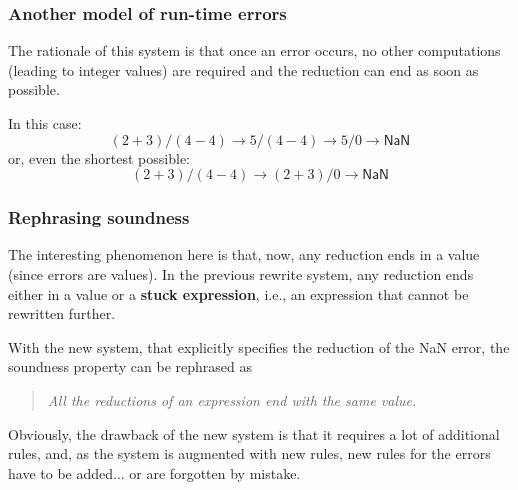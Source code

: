 \documentclass[compress,dvipdfmx]{beamer}
\newcommand{\NaN}{\textsf{NaN}\xspace}
\begin{document}
%
\begin{frame}
  \frametitle{Another model of run-time errors}

  The rationale of this system is that once an error occurs, no other
  computations (leading to integer values) are required and the
  reduction can end as soon as possible.

  \bigskip

  In this case:
  \begin{equation*}
    (2+3)/(4-4) \rightarrow 5/(4-4) \rightarrow 5/0 \rightarrow \NaN
  \end{equation*}
  or, even the shortest possible:
  \begin{equation*}
    (2+3)/(4-4) \rightarrow (2+3)/0 \rightarrow \NaN
  \end{equation*}

\end{frame}


%
\begin{frame}
  \frametitle{Rephrasing soundness}

  The interesting phenomenon here is that, now, any reduction ends in
  a value (since errors are values). In the previous rewrite system,
  any reduction ends either in a value or a \textbf{stuck expression},
  i.e., an expression that cannot be rewritten further.

  \bigskip

  With the new system, that explicitly specifies the reduction of the
  \NaN error, the soundness property can be rephrased as

  \medskip

  \begin{quote}
    \emph{All the reductions of an expression end with the same value.}
  \end{quote}
  Obviously, the drawback of the new system is that it requires a lot
  of additional rules, and, as the system is augmented with new rules,
  new rules for the errors have to be added... or are forgotten by
  mistake.

\end{frame}
\end{document}
